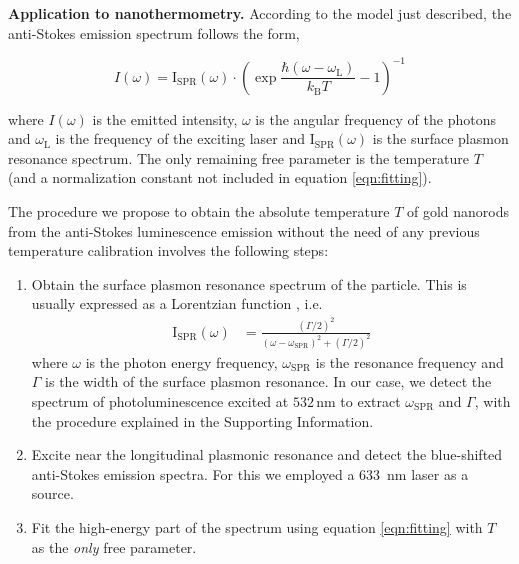 \documentclass[journal=nalefd,manuscript=letter]{achemso}
\newcommand{\HI}[1]{{#1}} %
\newcommand{\nm}{\ensuremath{\,\textrm{nm}}}
\begin{document}
\HI{\textbf{Application to nanothermometry.} According to the model just
described, the anti-Stokes emission spectrum follows the form,}

\begin{equation}\label{eqn:fitting}
	I(\omega) =
	\textrm{I}_{\textrm{SPR}}(\omega)\cdot\left(\exp\frac{\hbar(\omega-\omega_\textrm{L})}{k_\textrm{B}T}-1\right)^{-1}
\end{equation}

\noindent where $I(\omega) $ is the emitted intensity, $\omega$ is the angular frequency
of the photons and $\omega_\textrm{L}$ is the frequency of the \HI{exciting} laser and
$\textrm{I}_{\textrm{SPR}}(\omega) $ is the surface plasmon resonance \HI{spectrum}.
The only remaining free parameter is the temperature $T$ (and a normalization
constant not included in equation \ref{eqn:fitting}). 

\HI{The procedure we propose to obtain the absolute temperature $T$ of gold nanorods 
from the anti-Stokes luminescence emission without 
the need of any previous temperature calibration involves the following steps:}
\HI{\begin{enumerate}
	\item Obtain the surface plasmon resonance spectrum of the particle. This is usually expressed as a 
	Lorentzian function \cite{Zijlstra2011}, i.e.
	\begin{align*}
	\textrm{I}_{\textrm{SPR}}(\omega) &= \frac{\left( \Gamma/2 \right)^2}{\left( \omega-\omega_\textrm{SPR}\right)^2 +
	\left( \Gamma/2 \right)^2} 
	\end{align*}
	where $\omega$ is the photon energy frequency, $\omega_\textrm{SPR}$ is the resonance frequency 
	and $\Gamma$ is the width of the surface plasmon resonance.
	In our case, we detect the spectrum of photoluminescence	excited at $532\nm$ to extract 
	$\omega_\textrm{SPR}$ and $\Gamma$, with the procedure explained in the Supporting Information. 
	\item Excite near the longitudinal plasmonic resonance and detect the blue-shifted anti-Stokes emission spectra. For this we employed a $633\,$ nm  laser as a source. 
	\item Fit the high-energy part of the spectrum using equation \ref{eqn:fitting} with $T$ as the \textit{only} free parameter.
\end{enumerate}
}
\end{document}
